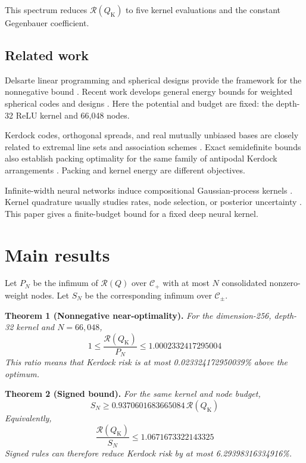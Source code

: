 \documentclass[11pt]{article}
\begin{document}
This spectrum reduces \(\mathcal{R}(Q_{\mathrm K})\) to five kernel
evaluations and the constant Gegenbauer coefficient.

\subsection{Related work}\label{related-work}

Delsarte linear programming and spherical designs provide the framework
for the nonnegative bound
\citep{delsarte1977, schoenberg1942, cohn2007, wendland2005}. Recent
work develops general energy bounds for weighted spherical codes and
designs \citep{borodachov2024weighted}. Here the potential and budget
are fixed: the depth-32 ReLU kernel and 66,048 nodes.

Kerdock codes, orthogonal spreads, and real mutually unbiased bases are
closely related to extremal line sets and association schemes
\citep{calderbank1997, boykin2005, abdukhalikov2009, can2020}. Exact
semidefinite bounds also establish packing optimality for the same
family of antipodal Kerdock arrangements \citep{cohn2024sdp}. Packing
and kernel energy are different objectives.

Infinite-width neural networks induce compositional Gaussian-process
kernels \citep{cho2009, daniely2016, lee2018, matthews2018}. Kernel
quadrature usually studies rates, node selection, or posterior
uncertainty \citep{briol2019, kanagawa2018}. This paper gives a
finite-budget bound for a fixed deep neural kernel.

\section{Main results}\label{main-results}

Let \(P_N\) be the infimum of \(\mathcal{R}(Q)\) over
\(\mathcal{C}_{+}\) with at most \(N\) consolidated nonzero-weight
nodes. Let \(S_N\) be the corresponding infimum over
\(\mathcal{C}_{\pm}\).

\textbf{Theorem 1 (Nonnegative near-optimality).} \emph{For the
dimension-256, depth-32 kernel and \(N=66{,}048\),} \[
1\leq
\frac{\mathcal{R}(Q_{\mathrm K})}{P_N}
\leq 1.0002332417295004
\] \emph{This ratio means that Kerdock risk is at most
0.023324172950039\% above the optimum.}

\textbf{Theorem 2 (Signed bound).} \emph{For the same kernel and node
budget,} \[
S_N
\geq 0.9370601683665084\,\mathcal{R}(Q_{\mathrm K})
\] \emph{Equivalently,} \[
\frac{\mathcal{R}(Q_{\mathrm K})}{S_N}
\leq 1.0671673322143325
\] \emph{Signed rules can therefore reduce Kerdock risk by at most
6.29398316334916\%.}
\end{document}
